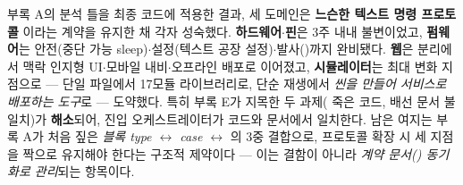 \begin{infobox}[title=최종 산출물 코드 정리 결론]
\small
부록 A의 분석 틀을 최종 코드에 적용한 결과, 세 도메인은 \textbf{느슨한 텍스트 명령 프로토콜}
이라는 계약을 유지한 채 각자 성숙했다. \textbf{하드웨어$\cdot$핀}은 3주 내내 불변이었고,
\textbf{펌웨어}는 안전(중단 가능 sleep)$\cdot$설정(텍스트 공장 설정)$\cdot$발사()까지
완비됐다. \textbf{웹}은  분리에서 맥락 인지형 UI$\cdot$모바일 내비$\cdot$오프라인 배포로
이어졌고, \textbf{시뮬레이터}는 최대 변화 지점으로 --- 단일 파일에서 17모듈 라이브러리로,
단순 재생에서 \emph{씬을 만들어 서비스로 배포하는 도구}로 --- 도약했다. 특히 부록 E가 지목한
두 과제( 죽은 코드,  배선 문서 불일치)가
\textbf{해소}되어, 진입 오케스트레이터가 코드와 문서에서 일치한다. 남은 여지는 부록 A가 처음
짚은 \emph{블록 type $\leftrightarrow$  case $\leftrightarrow$ }의
3중 결합으로, 프로토콜 확장 시 세 지점을 짝으로 유지해야 한다는 구조적 제약이다 --- 이는
결함이 아니라 \emph{계약 문서() 동기화로 관리}되는 항목이다.
\end{infobox}

